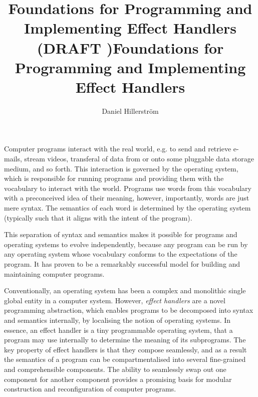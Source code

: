 \documentclass[12pt,phd,lfcs,twoside,openright,logo,leftchapter,normalheadings]{infthesis}
\title{Foundations for Programming and Implementing Effect Handlers\\
       (DRAFT \href{https://github.com/dhil/phd-dissertation/commit/\DRAFT}{\DRAFT})}
\title{Foundations for Programming and Implementing Effect Handlers}
\author{Daniel Hillerström}
\theoremstyle{plain}
\theoremstyle{definition}
\begin{document}
\raggedbottom
\begin{preliminary}

\maketitle

\begin{laysummary}
  Computer programs interact with the real world, e.g. to send and
  retrieve e-mails, stream videos, transferal of data from or onto
  some pluggable data storage medium, and so forth. This interaction
  is governed by the operating system, which is responsible for
  running programs and providing them with the vocabulary to interact
  with the world.
  Programs use words from this vocabulary with a preconceived idea of
  their meaning, however, importantly, words are just mere syntax. The
  semantics of each word is determined by the operating
  system (typically such that it aligns with the intent of the
  program).

  This separation of syntax and semantics makes it possible for
  programs and operating systems to evolve independently, because any
  program can be run by any operating system whose vocabulary conforms
  to the expectations of the program. It has proven to be a remarkably
  successful model for building and maintaining computer programs.

  Conventionally, an operating system has been a complex and
  monolithic single global entity in a computer system.
  However, \emph{effect handlers} are a novel programming abstraction,
  which enables programs to be decomposed into syntax and semantics
  internally, by localising the notion of operating systems. In
  essence, an effect handler is a tiny programmable operating system,
  that a program may use internally to determine the meaning of its
  subprograms. The key property of effect handlers is that they
  compose seamlessly, and as a result the semantics of a program can
  be compartmentalised into several fine-grained and comprehensible
  components. The ability to seamlessly swap out one component for
  another component provides a promising basis for modular
  construction and reconfiguration of computer programs.


\end{laysummary}
\end{preliminary}
\end{document}
